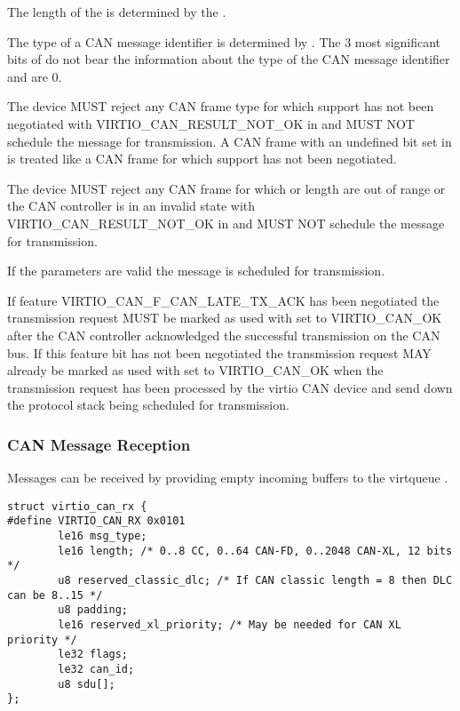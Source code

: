 The length of the  is determined by the .

The type of a CAN message identifier is determined by . The
3 most significant bits of  do not bear the information
about the type of the CAN message identifier and are 0.

The device MUST reject any CAN frame type for which support has not been
negotiated with VIRTIO_CAN_RESULT_NOT_OK in  and MUST NOT
schedule the message for transmission. A CAN frame with an undefined bit
set in  is treated like a CAN frame for which support has
not been negotiated.

The device MUST reject any CAN frame for which  or
 length are out of range or the CAN controller is in an
invalid state with VIRTIO_CAN_RESULT_NOT_OK in  and MUST
NOT schedule the message for transmission.

If the parameters are valid the message is scheduled for transmission.

If feature VIRTIO_CAN_F_CAN_LATE_TX_ACK has been negotiated the
transmission request MUST be marked as used with  set to
VIRTIO_CAN_OK after the CAN controller acknowledged the successful
transmission on the CAN bus. If this feature bit has not been negotiated
the transmission request MAY already be marked as used with
 set to VIRTIO_CAN_OK when the transmission request has
been processed by the virtio CAN device and send down the protocol stack
being scheduled for transmission.

\subsubsection{CAN Message Reception}\label{sec:Device Types / CAN Device / Device Operation / CAN Message Reception}

Messages can be received by providing empty incoming buffers to the
virtqueue .

\label{struct virtio_can_rx}
\begin{lstlisting}
struct virtio_can_rx {
#define VIRTIO_CAN_RX 0x0101
        le16 msg_type;
        le16 length; /* 0..8 CC, 0..64 CAN-FD, 0..2048 CAN-XL, 12 bits */
        u8 reserved_classic_dlc; /* If CAN classic length = 8 then DLC can be 8..15 */
        u8 padding;
        le16 reserved_xl_priority; /* May be needed for CAN XL priority */
        le32 flags;
        le32 can_id;
        u8 sdu[];
};
\end{lstlisting}

